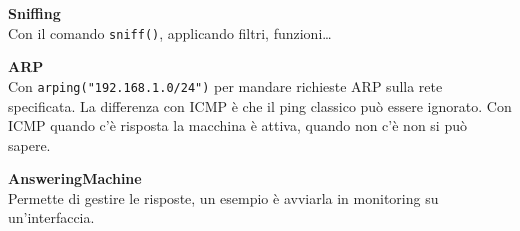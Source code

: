 \documentclass[10pt]{book}
\begin{document}
\begin{list}{}{}
	\item \textbf{Sniffing}\\
	Con il comando \texttt{sniff()}, applicando filtri, funzioni\ldots\\
	\item \textbf{ARP}\\
	Con \texttt{arping("192.168.1.0/24")} per mandare richieste ARP sulla rete specificata. La differenza con ICMP è che il ping classico può essere ignorato. Con ICMP quando c'è risposta la macchina è attiva, quando non c'è non si può sapere.
	\item \textbf{AnsweringMachine}\\
	Permette di gestire le risposte, un esempio è avviarla in monitoring su un'interfaccia. 
\end{list}
\end{document}
